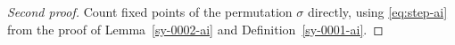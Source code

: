 \begin{proof}[Second proof]\label{sy-0005-ai}
Count fixed points of the permutation $\sigma$ directly, using \eqref{eq:step-ai} from the proof of Lemma~\ref{sy-0002-ai} and Definition~\ref{sy-0001-ai}.
\end{proof}